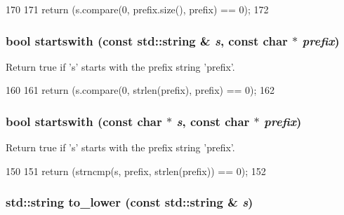 \begin{DoxyCode}
170 {
171     return (s.compare(0, prefix.size(), prefix) == 0);
172 }
\end{DoxyCode}
\hypertarget{str_8hh_ae05becd6094e015866b3eb856de59a16}{
\subsubsection[{startswith}]{\setlength{\rightskip}{0pt plus 5cm}bool startswith (const std::string \& {\em s}, \/  const char $\ast$ {\em prefix})}}
\label{str_8hh_ae05becd6094e015866b3eb856de59a16}
Return true if 's' starts with the prefix string 'prefix'. 


\begin{DoxyCode}
160 {
161     return (s.compare(0, strlen(prefix), prefix) == 0);
162 }
\end{DoxyCode}
\hypertarget{str_8hh_ac7909aa456343d780d6a9080a83b6d66}{
\subsubsection[{startswith}]{\setlength{\rightskip}{0pt plus 5cm}bool startswith (const char $\ast$ {\em s}, \/  const char $\ast$ {\em prefix})}}
\label{str_8hh_ac7909aa456343d780d6a9080a83b6d66}
Return true if 's' starts with the prefix string 'prefix'. 


\begin{DoxyCode}
150 {
151     return (strncmp(s, prefix, strlen(prefix)) == 0);
152 }
\end{DoxyCode}
\hypertarget{str_8hh_a83357519334853e90ee75c6deb86ed74}{
\subsubsection[{to\_\-lower}]{\setlength{\rightskip}{0pt plus 5cm}std::string to\_\-lower (const std::string \& {\em s})}}
\label{str_8hh_a83357519334853e90ee75c6deb86ed74}



